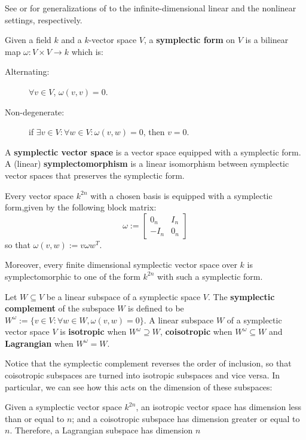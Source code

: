 See \cite{Weinstein2017} or  \cite{weinsteinsymplectic} for generalizations of to the infinite-dimensional linear and the nonlinear settings, respectively.
\begin{definition}
  Given a field  $k$ and a $k$-vector space $V$, a {\bf symplectic form} on $V$ is a bilinear map $\omega:V\times V\to k$ which is:
\begin{description}
 \item[Alternating:] $\forall v \in V$, $\omega(v,v)=0$.
 \item[Non-degenerate:] if $\exists v \in V: \forall w \in V: \omega(v,w)=0$, then $v=0$.
\end{description}
  A {\bf symplectic vector space} is a vector space equipped with a symplectic form. A (linear) {\bf symplectomorphism} is a linear isomorphism between symplectic vector spaces that preserves the symplectic form.
\end{definition}
\begin{lemma}
\label{lemma:sform}
Every vector space $k^{2n}$ with a chosen basis is equipped with a symplectic form,given by the following block matrix:
$$
\omega:=
\begin{bmatrix}
0_n & I_n\\
-I_n & 0_n
\end{bmatrix}
$$
so that $\omega(v,w) := v \omega w^T$.

Moreover, every finite dimensional symplectic vector space over $k$ is symplectomorphic to one of the form $k^{2n}$ with such a symplectic form.
\end{lemma}
\begin{definition}
Let $W \subseteq V$ be a linear subspace of a symplectic space $V$.
The {\bf symplectic complement} of the subspace $W$ is defined to be
$
W^\omega:= \{v \in V : \forall w \in W, \omega(v,w)=0 \}
$.
A linear subspace  $W$ of a symplectic vector space $V$ is {\bf isotropic} when $W^\omega \supseteq W$, {\bf coisotropic} when $W^\omega \subseteq W$ and {\bf Lagrangian} when $W^\omega=W$.
\end{definition}
Notice that the symplectic complement reverses the order of inclusion, so that coisotropic subspaces are turned into isotropic subspaces and vice versa.  In particular, we can see how this acts on the dimension of these subspaces:
\begin{lemma}
Given a symplectic vector space $k^{2n}$, an isotropic vector space has dimension less than or equal to $n$; and a coisotropic subspace has dimension greater or equal to $n$.  Therefore, a Lagrangian subspace has dimension $n$
\end{lemma}
